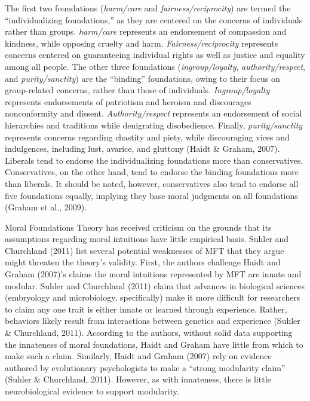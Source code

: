 \documentclass[english,,man]{apa6}
\begin{document}
The first two foundations (\emph{harm/care} and \emph{fairness/reciprocity}) are termed the \enquote{individualizing foundations,} as they are centered on the concerns of individuals rather than groups. \emph{harm/care} represents an endorsement of compassion and kindness, while opposing cruelty and harm. \emph{Fairness/reciprocity} represents concerns centered on guaranteeing individual rights as well as justice and equality among all people. The other three foundations (\emph{ingroup/loyalty}, \emph{authority/respect}, and \emph{purity/sanctity}) are the \enquote{binding} foundations, owing to their focus on group-related concerns, rather than those of individuals. \emph{Ingroup/loyalty} represents endorsements of patriotism and heroism and discourages nonconformity and dissent. \emph{Authority/respect} represents an endorsement of social hierarchies and traditions while denigrating disobedience. Finally, \emph{purity/sanctity} represents concerns regarding chastity and piety, while discouraging vices and indulgences, including lust, avarice, and gluttony (Haidt \& Graham, 2007). Liberals tend to endorse the individualizing foundations more than conservatives. Conservatives, on the other hand, tend to endorse the binding foundations more than liberals. It should be noted, however, conservatives also tend to endorse all five foundations equally, implying they base moral judgments on all foundations (Graham et al., 2009).

Moral Foundations Theory has received criticism on the grounds that its assumptions regarding moral intuitions have little empirical basis. Suhler and Churchland (2011) list several potential weaknesses of MFT that they argue might threaten the theory's validity. First, the authors challenge Haidt and Graham (2007)'s claims the moral intuitions represented by MFT are innate and modular. Suhler and Churchland (2011) claim that advances in biological sciences (embryology and microbiology, specifically) make it more difficult for researchers to claim any one trait is either innate or learned through experience. Rather, behaviors likely result from interactions between genetics and experience (Suhler \& Churchland, 2011). According to the authors, without solid data supporting the innateness of moral foundations, Haidt and Graham have little from which to make such a claim. Similarly, Haidt and Graham (2007) rely on evidence authored by evolutionary psychologists to make a \enquote{strong modularity claim} (Suhler \& Churchland, 2011). However, as with innateness, there is little neurobiological evidence to support modularity.
\end{document}
